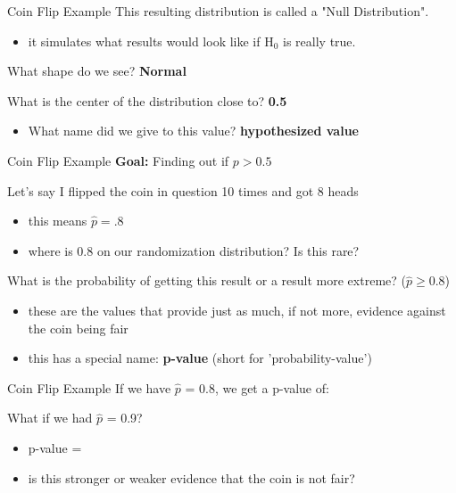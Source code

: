 \documentclass{beamer}
\begin{document}
\begin{frame}{Coin Flip Example}
This resulting distribution is called a "Null Distribution".
\begin{itemize}
    \item it simulates what results would look like if H$_0$ is really true.
\end{itemize} \vspace{8mm}

What shape do we see? \textbf{Normal} \vspace{8mm}

What is the center of the distribution close to? \textbf{0.5}
\begin{itemize}
    \item What name did we give to this value? \textbf{hypothesized value}
\end{itemize}\vspace{8mm}
\end{frame}

\begin{frame}{Coin Flip Example}
\textbf{Goal:} Finding out if $p > 0.5$ \vspace{4mm}

Let's say I flipped the coin in question 10 times and got 8 heads
\begin{itemize}
    \item this means $\widehat{p} = .8$
    \item where is 0.8 on our randomization distribution? Is this rare?
\end{itemize} \vspace{8mm}

What is the probability of getting this result or a result more extreme? ($\widehat{p} \geq 0.8$)
\begin{itemize}
    \item these are the values that provide just as much, if not more, evidence against the coin being fair
    \item this has a special name: \textbf{p-value} (short for 'probability-value')
\end{itemize} \vspace{8mm}
\end{frame}

\begin{frame}{Coin Flip Example}
If we have $\widehat{p}$ = 0.8, we get a p-value of: \vspace{6mm}

What if we had $\widehat{p}$ = 0.9?
\begin{itemize}
    \item p-value =
    \item is this stronger or weaker evidence that the coin is not fair?
\end{itemize}
\end{frame}
\end{document}
